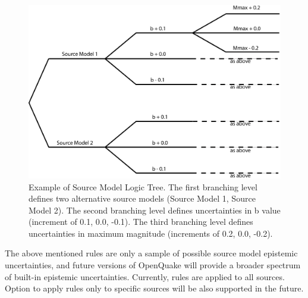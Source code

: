 \begin{figure}
\includegraphics[width=15cm]{./Figures/Part_Hazard/SourceModelLogicTree.eps}
\caption{Example of Source Model Logic Tree. The first branching level defines two alternative source models (Source Model 1, Source Model 2). The second branching level defines uncertainties in b value (increment of 0.1, 0.0, -0.1). The third branching level defines uncertainties in maximum magnitude (increments of 0.2, 0.0, -0.2).}
\label{fig:SourceModelLogicTree}
\end{figure}
The above mentioned rules are only a sample of possible source model epistemic uncertainties, and future versions of OpenQuake will provide a broader spectrum of built-in epistemic uncertainties. Currently, rules are applied to all sources. Option to apply rules only to specific sources will be also supported in the future.
